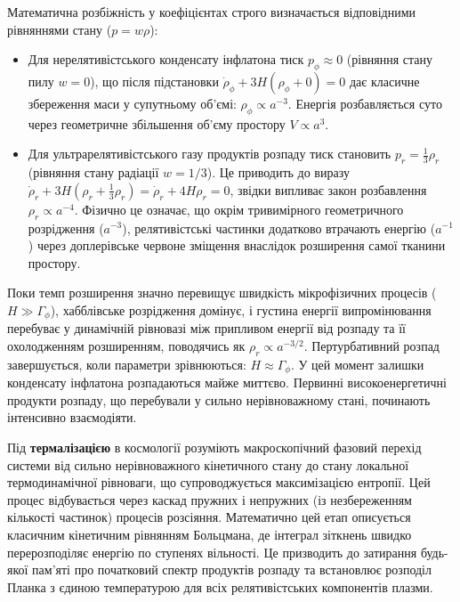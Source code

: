 Математична розбіжність у коефіцієнтах строго визначається відповідними рівняннями стану ($p = w\rho$):
\begin{itemize}
    \item Для нерелятивістського конденсату інфлатона тиск $p_\phi \approx 0$ (рівняння стану пилу $w=0$), що після підстановки $\dot{\rho}_\phi + 3H(\rho_\phi + 0) = 0$ дає класичне збереження маси у супутньому об'ємі: $\rho_\phi \propto a^{-3}$. Енергія розбавляється суто через геометричне збільшення об'єму простору $V \propto a^3$.
    \item Для ультрарелятивістського газу продуктів розпаду тиск становить $p_r = \frac{1}{3}\rho_r$ (рівняння стану радіації $w=1/3$). Це приводить до виразу $\dot{\rho}_r + 3H\left(\rho_r + \frac{1}{3}\rho_r\right) = \dot{\rho}_r + 4H\rho_r = 0$, звідки випливає закон розбавлення $\rho_r \propto a^{-4}$. Фізично це означає, що окрім тривимірного геометричного розрідження ($a^{-3}$), релятивістські частинки додатково втрачають енергію ($a^{-1}$) через доплерівське червоне зміщення внаслідок розширення самої тканини простору.
\end{itemize}

Поки темп розширення значно перевищує швидкість мікрофізичних процесів ($H \gg \Gamma_\phi$), хабблівське розрідження домінує, і густина енергії випромінювання перебуває у динамічній рівновазі між припливом енергії від розпаду та її охолодженням розширенням, поводячись як $\rho_r \propto a^{-3/2}$. Пертурбативний розпад завершується, коли параметри зрівнюються: $H \approx \Gamma_\phi$. У цей момент залишки конденсату інфлатона розпадаються майже миттєво. Первинні високоенергетичні продукти розпаду, що перебували у сильно нерівноважному стані, починають інтенсивно взаємодіяти.

Під \textbf{термалізацією} в космології розуміють макроскопічний фазовий перехід системи від сильно нерівноважного кінетичного стану до стану локальної термодинамічної рівноваги, що супроводжується максимізацією ентропії. Цей процес відбувається через каскад пружних і непружних (із незбереженням кількості частинок) процесів розсіяння. Математично цей етап описується класичним кінетичним рівнянням Больцмана, де інтеграл зіткнень швидко перерозподіляє енергію по ступенях вільності. Це призводить до затирання будь-якої пам'яті про початковий спектр продуктів розпаду та встановлює розподіл Планка з єдиною температурою для всіх релятивістських компонентів плазми.

